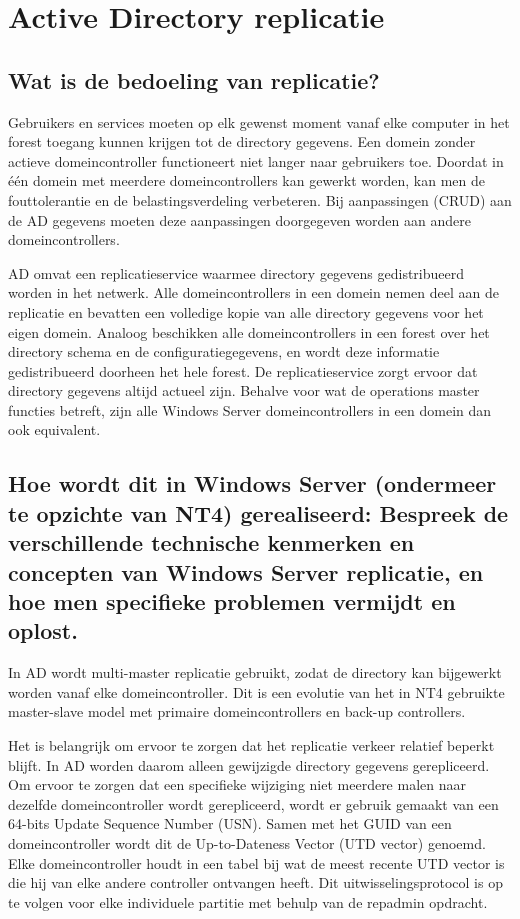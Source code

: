 \chapter{Active Directory replicatie}

\section{Wat is de bedoeling van replicatie?}

Gebruikers en services moeten op elk gewenst moment vanaf elke computer in het
forest toegang kunnen krijgen tot de directory gegevens. Een domein zonder
actieve domeincontroller functioneert niet langer naar gebruikers toe. Doordat
in één domein met meerdere domeincontrollers kan gewerkt worden, kan men de
fouttolerantie en de belastingsverdeling verbeteren. Bij aanpassingen (CRUD) aan
de AD gegevens moeten deze aanpassingen doorgegeven worden aan andere
domeincontrollers.

AD omvat een replicatieservice waarmee directory gegevens gedistribueerd worden
in het netwerk. Alle domeincontrollers in een domein nemen deel aan de
replicatie en bevatten een volledige kopie van alle directory gegevens voor het
eigen domein. Analoog beschikken alle domeincontrollers in een forest over het
directory schema en de configuratiegegevens, en wordt deze informatie
gedistribueerd doorheen het hele forest. De replicatieservice zorgt ervoor dat
directory gegevens altijd actueel zijn. Behalve voor wat de operations master
functies betreft, zijn alle Windows Server domeincontrollers in een domein dan
ook equivalent.

\section{Hoe wordt dit in Windows Server (ondermeer te opzichte van NT4)
gerealiseerd: Bespreek de verschillende technische kenmerken en concepten van
Windows Server replicatie, en hoe men specifieke problemen vermijdt en oplost.}

In AD wordt multi-master replicatie gebruikt, zodat de directory kan bijgewerkt
worden vanaf elke domeincontroller. Dit is een evolutie van het in NT4 gebruikte
master-slave model met primaire domeincontrollers en back-up controllers.

Het is belangrijk om ervoor te zorgen dat het replicatie verkeer relatief
beperkt blijft. In AD worden daarom alleen gewijzigde directory gegevens
gerepliceerd. Om ervoor te zorgen dat een specifieke wijziging niet meerdere
malen naar dezelfde domeincontroller wordt gerepliceerd, wordt er gebruik
gemaakt van een 64-bits Update Sequence Number (USN). Samen met het GUID van een
domeincontroller wordt dit de Up-to-Dateness Vector (UTD vector) genoemd. Elke
domeincontroller houdt in een tabel bij wat de meest recente UTD vector is die
hij van elke andere controller ontvangen heeft. Dit uitwisselingsprotocol is op
te volgen voor elke individuele partitie met behulp van de repadmin opdracht.

